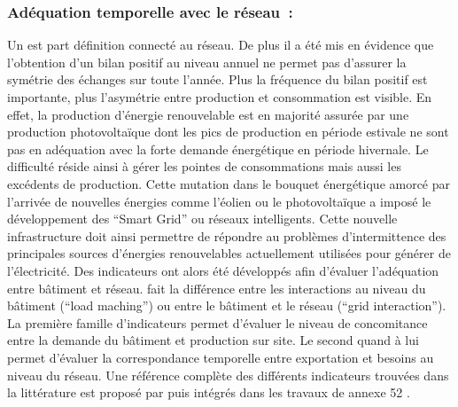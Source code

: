 \subsubsection{Adéquation temporelle avec le réseau~:} %
\label{ssub:adequation_temporelle_avec_le_réseau}
Un  est part définition connecté au réseau. De plus il a été mis en évidence
que l’obtention d’un bilan positif au niveau annuel ne permet pas d’assurer la
symétrie des échanges sur toute l’année. Plus la fréquence du bilan positif est importante,
plus l’asymétrie entre production et consommation est visible. En effet, la production
d’énergie renouvelable est en majorité assurée par une production photovoltaïque
dont les pics de production en période estivale ne sont pas en adéquation avec la forte demande
énergétique en période hivernale. Le difficulté réside ainsi à gérer les pointes
de consommations mais aussi les excédents de production.
Cette mutation dans le bouquet énergétique amorcé par l’arrivée de nouvelles énergies comme
l’éolien ou le photovoltaïque a imposé le développement des \enquote{Smart Grid}
ou réseaux intelligents. Cette nouvelle infrastructure doit ainsi permettre de répondre
au problèmes d’intermittence des principales sources d’énergies renouvelables actuellement
utilisées pour générer de l’électricité. Des indicateurs ont alors été développés
afin d’évaluer l’adéquation entre bâtiment et réseau.
\textcite{Voss2010} fait la différence entre les interactions au niveau du bâtiment
(\enquote{load maching}) ou entre le bâtiment et le réseau (\enquote{grid interaction}).
La première famille d’indicateurs permet d’évaluer le niveau de concomitance entre la
demande du bâtiment et production sur site. Le second quand à lui permet d’évaluer
la correspondance temporelle entre exportation et besoins au niveau du réseau.
Une référence complète des différents indicateurs trouvées dans la littérature est
proposé par \textcite{Salom2011} puis intégrés dans les travaux de annexe 52 \parencite{Salom2014}.


